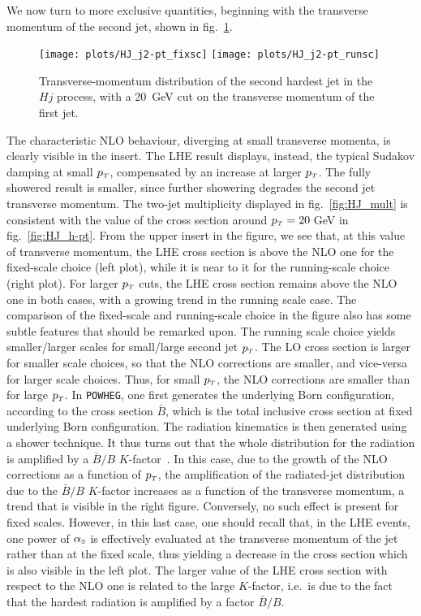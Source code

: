 \documentclass[paper]{JHEP3}
\newlength{\hfig}
\newlength{\hfigs}
\newcommand\sss{\mathchoice%
{\displaystyle}%
{\scriptstyle}%
{\scriptscriptstyle}%
{\scriptscriptstyle}%
}
\newcommand\as{\alpha_{\sss\rm S}}
\newcommand\pT{p_{\sss T}}
\newcommand\POWHEG{{\tt POWHEG}}
\begin{document}
We now turn to more exclusive quantities, beginning with the transverse
momentum of the second jet, shown in fig.~\ref{fig:HJ_j2-pt}.
\begin{figure}[htb]
\begin{center}
\texttt{[image: plots/HJ\_j2-pt\_fixsc]}  \nolinebreak
\texttt{[image: plots/HJ\_j2-pt\_runsc]} 
\caption{Transverse-momentum distribution of the second hardest jet in the
  $Hj$ process, with a 20~GeV cut on the transverse momentum of the first
  jet.}
\label{fig:HJ_j2-pt}
\end{center}
\end{figure}
The characteristic NLO behaviour, diverging at small transverse momenta, is
clearly visible in the insert. The LHE result displays, instead, the typical
Sudakov damping at small $\pT$, compensated by an increase at larger
$\pT$. The fully showered result is smaller, since further showering degrades
the second jet transverse momentum. The two-jet multiplicity displayed in
fig.~\ref{fig:HJ_mult} is consistent with the value of the cross section
around $\pT=20\;$GeV in fig.~\ref{fig:HJ_h-pt}.  From the upper insert in the
figure, we see that, at this value of transverse momentum, the LHE cross
section is above the NLO one for the fixed-scale choice (left plot), while it
is near to it for the running-scale choice (right plot). For larger $\pT$
cuts, the LHE cross section remains above the NLO one in both cases, with a
growing trend in the running scale case.  The comparison of the fixed-scale
and running-scale choice in the figure also has some subtle features that
should be remarked upon. The running scale choice yields smaller/larger
scales for small/large second jet $\pT$. The LO cross section is larger for
smaller scale choices, so that the NLO corrections are smaller, and
vice-versa for larger scale choices. Thus, for small $\pT$, the NLO
corrections are smaller than for large $\pT$.  In \POWHEG{}, one first
generates the underlying Born configuration, according to the cross section
$\bar{B}$, which is the total inclusive cross section at fixed underlying
Born configuration. The radiation kinematics is then generated using a shower
technique. It thus turns out that the whole distribution for the radiation is
amplified by a $\bar{B}/B$ $K$-factor~\cite{Alioli:2008tz, Nason:2010ap,
  Nason:2012pr}.  In this case, due to the growth of the NLO corrections as a
function of $\pT$, the amplification of the radiated-jet distribution due to
the $\bar{B}/B$ $K$-factor increases as a function of the transverse
momentum, a trend that is visible in the right figure. Conversely, no such
effect is present for fixed scales. However, in this last case, one should
recall that, in the LHE events, one power of $\as$ is effectively evaluated
at the transverse momentum of the jet rather than at the fixed scale, thus
yielding a decrease in the cross section which is also visible in the left
plot.
%
The larger value of the LHE cross section with respect to the NLO one is
related to the large $K$-factor, i.e.~is due to the fact that the hardest
radiation is amplified by a factor $\bar{B}/B$.
\end{document}
